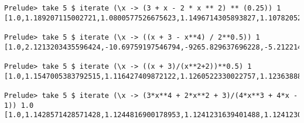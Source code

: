 \begin{verbatim}
Prelude> take 5 $ iterate (\x -> (3 + x - 2 * x ** 2) ** (0.25)) 1
[1.0,1.189207115002721,1.0800577526675623,1.1496714305893827,1.1078205295102599]

Prelude> take 5 $ iterate (\x -> ((x + 3 - x**4) / 2**0.5)) 1
[1.0,2.1213203435596424,-10.69759197546794,-9265.829637696228,-5.21221409147882e15]

Prelude> take 5 $ iterate (\x -> ((x + 3)/(x**2+2))**0.5) 1
[1.0,1.1547005383792515,1.116427409872122,1.1260522330022757,1.1236388847132548]

Prelude> take 5 $ iterate (\x -> (3*x**4 + 2*x**2 + 3)/(4*x**3 + 4*x - 1)) 1.0
[1.0,1.1428571428571428,1.1244816900178953,1.1241231639401488,1.124123029704334]
\end{verbatim}
